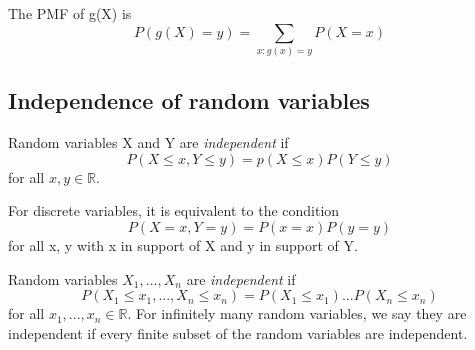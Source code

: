 \documentclass[12pt, letterpaper]{article}
\begin{document}
The PMF of g(X) is 
\[ 
P(g(X) = y) = \sum_{x:g(x)=y}P(X=x)
\] 

\subsection{Independence of random variables}

Random variables X and Y are \textit{independent} if 
\[ 
P(X \leq x, Y \leq y) = p(X \leq x)P(Y \leq y)    
\]
for all \(x, y \in \mathbb{R}\).

For discrete variables, it is equivalent to the condition 
\[ 
P(X = x, Y = y) = P(x = x)P(y = y)
\]
for all x, y with x in support of X and y in support of Y.

Random variables \(X_1, ..., X_n\) are \textit{independent} if 
\[ 
P(X_1 \leq x_1, ..., X_n \leq x_n) = P(X_1 \leq x_1)...P(X_n \leq x_n)
\] 
for all \(x_1, ..., x_n \in \mathbb{R}\). For infinitely many random variables, we say they are independent if every finite subset of the random variables are independent.
\end{document}

